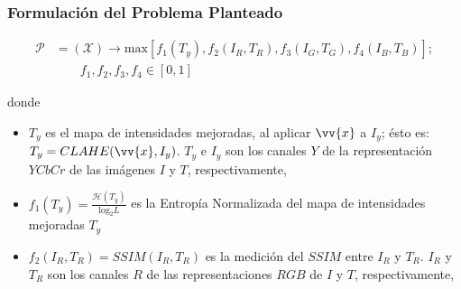 \documentclass[usenames,dvipsnames]{beamer}
\begin{document}
\begin{frame}
\frametitle{Formulación del Problema Planteado} 

\begin{equation}
\begin{split}
\mathscr{P} &= (\mathscr{X}) \longrightarrow \text{max}[f_1(T_y),f_2(I_R,T_R),f_3(I_G,T_G),f_4(I_B,T_B)]; \\
            & \qquad f_1,f_2,f_3,f_4 \in [0,1]
\end{split}
\end{equation}


donde

\begin{itemize}
	\item $T_y$ es el mapa de intensidades mejoradas, al aplicar $\vv{x}$ a $I_y$; ésto es: $T_y=CLAHE(\vv{x},I_y\label{symbol:ioriginaly})$. $T_y$ e $I_y$ son los canales $Y$ de la representación $YCbCr$  de las imágenes $I$ y $T$, respectivamente,
	\item $f_1(T_y)\label{symbol:imejoraday}=\frac{\mathscr{H}(T_y)}{\text{log}_2L}$ es la Entropía Normalizada del mapa de intensidades mejoradas $T_y$
	\item $f_2(I_R\label{symbol:ioriginalr},T_R\label{symbol:imejoradar})=SSIM(I_R,T_R)$ es la medición del $SSIM$ entre $I_R$ y $T_R$. $I_R$ y $T_R$ son los canales $R$ de las representaciones $RGB$ de $I$ y $T$, respectivamente,
\end{itemize}





\end{frame}
\end{document}
